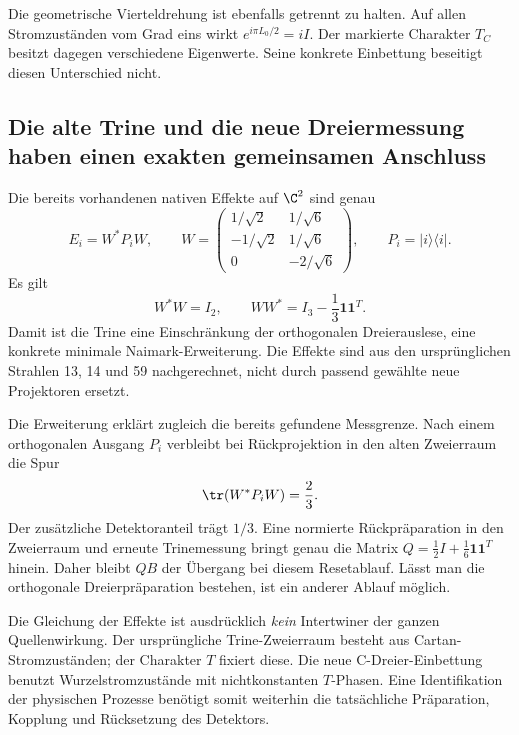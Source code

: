 Die geometrische Vierteldrehung ist ebenfalls getrennt zu halten. Auf allen Stromzuständen vom Grad eins wirkt $e^{i\pi L_0/2}=iI$. Der markierte Charakter $T_C$ besitzt dagegen verschiedene Eigenwerte. Seine konkrete Einbettung beseitigt diesen Unterschied nicht.

\subsection{Die alte Trine und die neue Dreiermessung haben einen exakten gemeinsamen Anschluss}
Die bereits vorhandenen nativen Effekte auf $\C^2$ sind genau
\begin{equation}
E_i=W^*P_iW,\qquad
W=\begin{pmatrix}
1/\sqrt2&1/\sqrt6\\
-1/\sqrt2&1/\sqrt6\\
0&-2/\sqrt6
\end{pmatrix},
\qquad P_i=|i\rangle\langle i|.
\end{equation}
Es gilt
\begin{equation}
W^*W=I_2,\qquad WW^*=I_3-\frac13\mathbf1\mathbf1^T.
\end{equation}
Damit ist die Trine eine Einschränkung der orthogonalen Dreierauslese, eine konkrete minimale Naimark-Erweiterung. Die Effekte sind aus den ursprünglichen Strahlen 13, 14 und 59 nachgerechnet, nicht durch passend gewählte neue Projektoren ersetzt.

Die Erweiterung erklärt zugleich die bereits gefundene Messgrenze. Nach einem orthogonalen Ausgang $P_i$ verbleibt bei Rückprojektion in den alten Zweierraum die Spur
\begin{equation}
\tr(W^*P_iW)=\frac23.
\end{equation}
Der zusätzliche Detektoranteil trägt $1/3$. Eine normierte Rückpräparation in den Zweierraum und erneute Trinemessung bringt genau die Matrix
$Q=\tfrac12I+\tfrac16\mathbf1\mathbf1^T$ hinein. Daher bleibt $QB$ der Übergang bei diesem Resetablauf. Lässt man die orthogonale Dreierpräparation bestehen, ist ein anderer Ablauf möglich.

Die Gleichung der Effekte ist ausdrücklich \emph{kein} Intertwiner der ganzen Quellenwirkung. Der ursprüngliche Trine-Zweierraum besteht aus Cartan-Stromzuständen; der Charakter $T$ fixiert diese. Die neue C-Dreier-Einbettung benutzt Wurzelstromzustände mit nichtkonstanten $T$-Phasen. Eine Identifikation der physischen Prozesse benötigt somit weiterhin die tatsächliche Präparation, Kopplung und Rücksetzung des Detektors.

